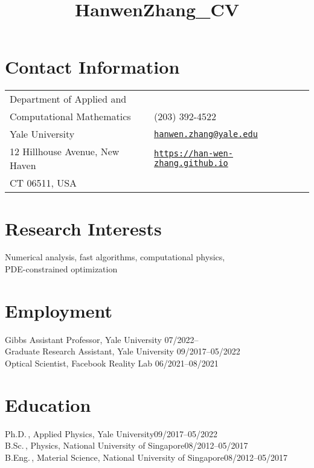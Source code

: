 \documentclass[margin,line,pifont,palatino,courier]{res}
\begin{document}
\title{HanwenZhang_CV}
\begin{resume}

\section{\sc Contact Information}

\vspace{.05in}
\begin{tabular}{@{}p{2.75in}p{2in}}
Department of Applied  and &  \\
Computational Mathematics & (203) 392-4522 \\
Yale University &  
\href{mailto:hanwen.zhang@yale.edu}
{\texttt{hanwen.zhang@yale.edu}}\\
12 Hillhouse Avenue, New Haven & 
\href{https://han-wen-zhang.github.io/}
{\texttt{https://han-wen-zhang.github.io}}\\
 CT 06511, USA   & \\
             
\end{tabular}

\section{\sc Research Interests}
Numerical analysis, fast algorithms, computational physics,\\ PDE-constrained optimization

\section{\sc Employment}
Gibbs Assistant Professor, Yale University \hfill  07/2022-- \hspace*{1.12cm}\\
Graduate Research Assistant, Yale University \hfill 09/2017--05/2022\\
Optical Scientist, Facebook Reality Lab \hfill 06/2021--08/2021

\section{\sc Education}
Ph.D.\,, Applied Physics, Yale University\hfill 09/2017--05/2022\\
B.Sc.\,, Physics, National University of Singapore\hfill 08/2012--05/2017\\
B.Eng.\,, Material Science, National University of Singapore\hfill 08/2012--05/2017


\end{resume}
\end{document}
